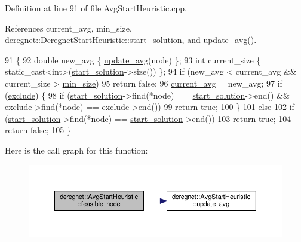 Definition at line 91 of file Avg\+Start\+Heuristic.\+cpp.



References current\+\_\+avg, min\+\_\+size, deregnet\+::\+Deregnet\+Start\+Heuristic\+::start\+\_\+solution, and update\+\_\+avg().


\begin{DoxyCode}
91                                                 \{
92     \textcolor{keywordtype}{double} new\_avg \{ \hyperlink{classderegnet_1_1AvgStartHeuristic_ab3cbc873952af7525654194a7d5e59e0}{update\_avg}(node) \};
93     \textcolor{keywordtype}{int} current\_size \{ \textcolor{keyword}{static\_cast<}\textcolor{keywordtype}{int}\textcolor{keyword}{>}(\hyperlink{classderegnet_1_1DeregnetStartHeuristic_a7450e11ca0a265b055f95e7832b65e2f}{start\_solution}->size()) \};
94     \textcolor{keywordflow}{if} (new\_avg < current\_avg && current\_size > \hyperlink{classderegnet_1_1AvgStartHeuristic_a3abc4d801d4eb1fdb8ecfed7077045b3}{min\_size})
95         \textcolor{keywordflow}{return} \textcolor{keyword}{false};
96     \hyperlink{classderegnet_1_1AvgStartHeuristic_a2c4b3fa6aa7946276404e650ea42fd14}{current\_avg} = new\_avg;
97     \textcolor{keywordflow}{if} (\hyperlink{classderegnet_1_1DeregnetStartHeuristic_aa22c6581cd404bf7ac325850b28dc951}{exclude}) \{
98         \textcolor{keywordflow}{if} (\hyperlink{classderegnet_1_1DeregnetStartHeuristic_a7450e11ca0a265b055f95e7832b65e2f}{start\_solution}->find(*node) == \hyperlink{classderegnet_1_1DeregnetStartHeuristic_a7450e11ca0a265b055f95e7832b65e2f}{start\_solution}->end() && 
      \hyperlink{classderegnet_1_1DeregnetStartHeuristic_aa22c6581cd404bf7ac325850b28dc951}{exclude}->find(*node) == \hyperlink{classderegnet_1_1DeregnetStartHeuristic_aa22c6581cd404bf7ac325850b28dc951}{exclude}->end())
99             \textcolor{keywordflow}{return} \textcolor{keyword}{true};
100         \}
101     \textcolor{keywordflow}{else}
102         \textcolor{keywordflow}{if} (\hyperlink{classderegnet_1_1DeregnetStartHeuristic_a7450e11ca0a265b055f95e7832b65e2f}{start\_solution}->find(*node) == \hyperlink{classderegnet_1_1DeregnetStartHeuristic_a7450e11ca0a265b055f95e7832b65e2f}{start\_solution}->end())
103             \textcolor{keywordflow}{return} \textcolor{keyword}{true};
104     \textcolor{keywordflow}{return} \textcolor{keyword}{false};
105 \}
\end{DoxyCode}


Here is the call graph for this function\+:\nopagebreak
\begin{figure}[H]
\begin{center}
\leavevmode
\includegraphics[width=350pt]{classderegnet_1_1AvgStartHeuristic_a3e18528bc735d47edcd719a72baf4e46_cgraph}
\end{center}
\end{figure}


